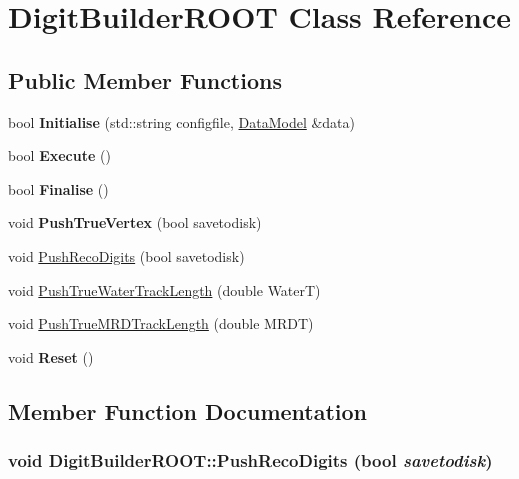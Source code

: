 \hypertarget{classDigitBuilderROOT}{
\section{DigitBuilderROOT Class Reference}
\label{classDigitBuilderROOT}
}
\subsection*{Public Member Functions}
\begin{DoxyCompactItemize}
\item 
\hypertarget{classDigitBuilderROOT_a7ab06541c442a8bc03adc0c7a4b32086}{
bool {\bfseries Initialise} (std::string configfile, \hyperlink{classDataModel}{DataModel} \&data)}
\label{classDigitBuilderROOT_a7ab06541c442a8bc03adc0c7a4b32086}

\item 
\hypertarget{classDigitBuilderROOT_a9529acec5b1a6cf468e57c96bf55453d}{
bool {\bfseries Execute} ()}
\label{classDigitBuilderROOT_a9529acec5b1a6cf468e57c96bf55453d}

\item 
\hypertarget{classDigitBuilderROOT_a1beb47fea60dc16f627a339ee0597e71}{
bool {\bfseries Finalise} ()}
\label{classDigitBuilderROOT_a1beb47fea60dc16f627a339ee0597e71}

\item 
\hypertarget{classDigitBuilderROOT_a894cb087ddb66f65fe966d4155b03256}{
void {\bfseries PushTrueVertex} (bool savetodisk)}
\label{classDigitBuilderROOT_a894cb087ddb66f65fe966d4155b03256}

\item 
void \hyperlink{classDigitBuilderROOT_af623aff0f8d4b58cb4c7182da49b76b7}{PushRecoDigits} (bool savetodisk)
\item 
void \hyperlink{classDigitBuilderROOT_a7edde994bef160f405d740b5e9b01176}{PushTrueWaterTrackLength} (double WaterT)
\item 
void \hyperlink{classDigitBuilderROOT_adca0d96fa944b38e44e2ebb8a619f77b}{PushTrueMRDTrackLength} (double MRDT)
\item 
\hypertarget{classDigitBuilderROOT_a01cd5fb15e6ebe304ba751652de2b37b}{
void {\bfseries Reset} ()}
\label{classDigitBuilderROOT_a01cd5fb15e6ebe304ba751652de2b37b}

\end{DoxyCompactItemize}


\subsection{Member Function Documentation}
\hypertarget{classDigitBuilderROOT_af623aff0f8d4b58cb4c7182da49b76b7}{
\subsubsection[{PushRecoDigits}]{\setlength{\rightskip}{0pt plus 5cm}void DigitBuilderROOT::PushRecoDigits (bool {\em savetodisk})}}
\label{classDigitBuilderROOT_af623aff0f8d4b58cb4c7182da49b76b7}



